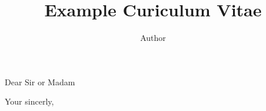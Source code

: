 \documentclass[a4paper]{arthur-cover-letter}
\title{Example Curiculum Vitae}
\author{Author}
\begin{document}
    \makeprofile %

    \address{John \\123, somestreet\\Somecity}




    \begin{coverletter}%

            \subject{Application to job of my life}

            \opening{Dear Sir or Madam}

            \lipsum[1-4]

            \closing{Your sincerly,} %


    \end{coverletter}
\end{document}
